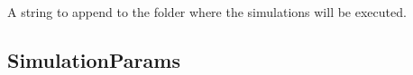 \documentclass[letterpaper,10pt,english]{sphinxmanual}
\begin{document}
\begin{fulllineitems}
\begin{fulllineitems}
\label{\detokenize{API:raypyng.simulate.Simulate.simulation_name}}
\pysigstartsignatures
{}
\pysigstopsignatures
\sphinxAtStartPar
A string to append to the folder where the simulations will be executed.

\end{fulllineitems}


\end{fulllineitems}



\subsection{SimulationParams}
\label{\detokenize{API:simulationparams}}
\end{document}
